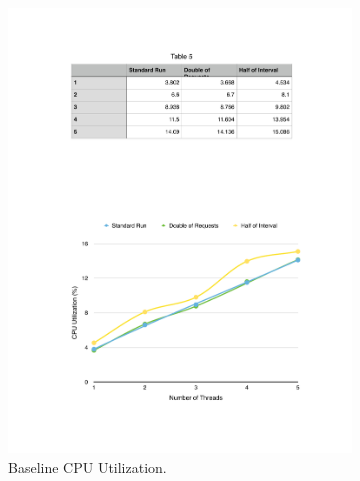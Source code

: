 \begin{figure}[ht!]
\centering
\begin{subfigure}{.5\textwidth}
  \centering
  \includegraphics[width=\linewidth]{./images/cpu_1_lap}
  \caption{Baseline CPU Utilization.}
  \label{fig:eval_baseline_cpu}
\end{subfigure}%
\begin{subfigure}{.5\textwidth}
  \centering

\end{subfigure}
\end{figure}

